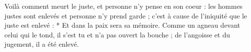 Voilà comment meurt le juste, et personne n'y pense en son coeur : les hommes justes sont enlevés et personne n'y prend garde ; c'est à cause de l'iniquité que le juste est enlevé :
* Et dans la paix sera sa mémoire.
\versseparator
Comme un agneau devant celui qui le tond, il s'est tu et n'a pas ouvert la bouche ; de l'angoisse et du jugement, il a été enlevé.